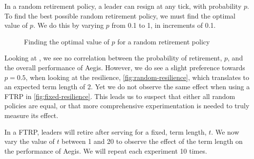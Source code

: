 In a random retirement policy, a leader can resign at any tick, with probability $p$. To find the best possible random retirement policy, we must find the optimal value of $p$. We do this by varying $p$ from 0.1 to 1, in increments of 0.1.
\begin{figure}[!h]
	\centering
	\caption{Finding the optimal value of $p$ for a random retirement policy}
        \label{fig:random}
\end{figure}

Looking at \label{fig:random}, we see no correlation between the probability of retirement, $p$, and the overall performance of Aegis. However, we do see a slight preference towards $p = 0.5$, when looking at the resilience, \autoref{fig:random-resilience}, which translates to an expected term length of 2. Yet we do not observe the same effect when using a FTRP in \autoref{fig:fixed-resilience}. This leads us to suspect that either all random policies are equal, or that more comprehensive experimentation is needed to truly measure its effect.

In a FTRP, leaders will retire after serving for a fixed, term length, $t$. We now vary the value of $t$ between 1 and 20 to observe the effect of the term length on the performance of Aegis. We will repeat each experiment 10 times.

